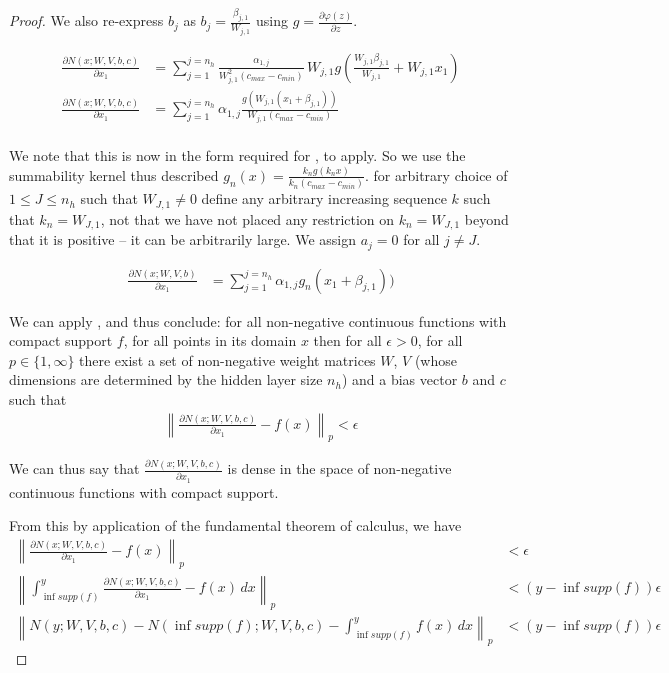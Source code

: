 \documentclass{article} %
\begin{document}
\begin{proof}
We also re-express $b_j$ as $b_j=\frac{\beta_{j,1}}{W_{j,1}}$  using $g = \frac{\partial\varphi(z)}{\partial z}$.


\begin{align}
\frac{\partial N(x;W,V,b,c)}{\partial x_1} 
&= \sum_{j=1}^{j=n_h} \frac{\alpha_{1,j}}{W_{j,1}^2(c_{max}-c_{min})} \, W_{j,1} g(\frac{W_{j,1}\beta_{j,1}}{W_{j,1}} + W_{j,1}x_1)\\
\frac{\partial N(x;W,V,b,c)}{\partial x_1} 
&= \sum_{j=1}^{j=n_h} \alpha_{1,j} \frac{ g(W_{j,1}\left( x_1 + \beta_{j,1} \right))}{W_{j,1}(c_{max}-c_{min})} \\
\end{align}

We note that this is now in the form required for ,
to apply.
So we use the summability kernel thus described $g_n(x) = \frac{k_n g(k_n x)}{k_n(c_{max}-c_{min})}$.
for arbitrary choice of $1 \le J \le n_h$ such that $W_{J,1} \ne 0$
define any arbitrary increasing sequence $k$ such that $k_n=W_{J,1}$,
not that we have not placed any restriction on $k_n=W_{J,1}$ beyond that it is positive -- it can be arbitrarily large.
We assign  $a_j=0$ for all $j \ne J$.


\begin{align}
\frac{\partial N(x;W,V,b)}{\partial x_1} 
&= \sum_{j=1}^{j=n_h} \alpha_{1,j} g_n\left( x_1 + \beta_{j,1} \right))
\end{align}

We can apply , and thus conclude:
for all non-negative continuous functions with compact support $f$,
for all points in its domain $x$
then for all $\epsilon > 0$, for all $p\in \lbrace 1, \infty \rbrace$
there exist a set of non-negative weight matrices $W$, $V$ (whose dimensions are determined by the hidden layer size $n_h$) and a bias vector $b$ and $c$
such that 
\begin{align}
\left\|\frac{\partial N(x;W,V,b, c)}{\partial x_1} - f(x) \right\|_p < \epsilon
\end{align}

We can thus say that $\frac{\partial N(x;W,V,b,c)}{\partial x_1}$ is dense in the space of non-negative continuous functions with compact support.

From this by application of the fundamental theorem of calculus,
we have
\begin{align}
\left\| \frac{\partial N(x;W,V,b, c)}{\partial x_1} - f(x) \right\|_p &< \epsilon \\
\left\| \int_{\inf supp(f)}^y \frac{\partial N(x;W,V,b, c)}{\partial x_1} - f(x) \, dx \right\|_p &< \left( y-\inf supp(f) \right)  \epsilon \\
\left\| N(y;W,V,b, c) - N(\inf supp(f);W,V,b, c) - \int_{\inf supp(f)}^y f(x) \, dx \right\|_p &< \left( y-\inf supp(f) \right)  \epsilon
\end{align}


\end{proof}
\end{document}
